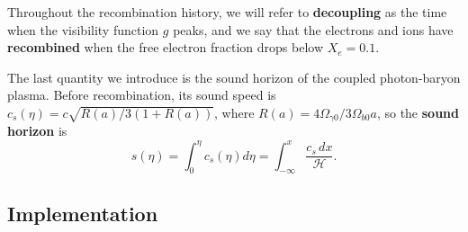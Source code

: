 \documentclass[10pt,a4paper]{article}
\begin{document}
Throughout the recombination history, we will refer to
\textbf{decoupling} as the time when the visibility function $g$ peaks,
and we say that the electrons and ions have \textbf{recombined} when the free electron fraction drops below $X_e = 0.1$.

The last quantity we introduce is the sound horizon
of the coupled photon-baryon plasma.
Before recombination, its sound speed is
$c_s(\eta) = c \sqrt{R(a) / 3(1+R(a))}$,
where $R(a) = 4 \Omega_{\gamma 0} / 3 \Omega_{b 0} a$,
so the \textbf{sound horizon} is
\begin{equation}
	s(\eta) = \int_0^\eta c_s(\eta) d\eta = \int_{-\infty}^x \frac{c_s \, dx}{\mathcal{H}}.
\label{eq_sound_horizon}
\end{equation}

\subsection{Implementation}
\end{document}
